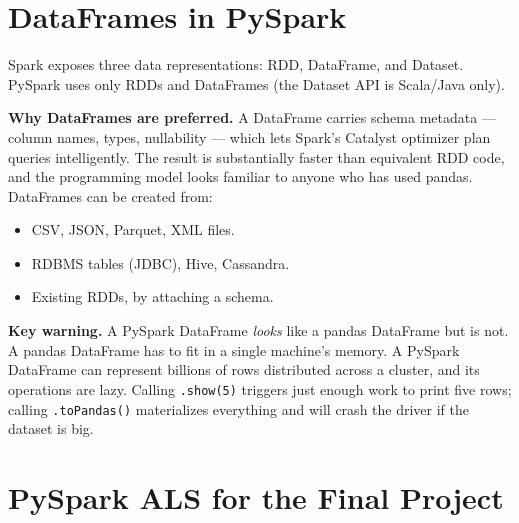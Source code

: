 \documentclass[11pt]{article}
\begin{document}
\section{DataFrames in PySpark}

Spark exposes three data representations: RDD, DataFrame, and Dataset. PySpark uses only RDDs and DataFrames (the Dataset API is Scala/Java only).

\textbf{Why DataFrames are preferred.} A DataFrame carries schema metadata --- column names, types, nullability --- which lets Spark's Catalyst optimizer plan queries intelligently. The result is substantially faster than equivalent RDD code, and the programming model looks familiar to anyone who has used pandas. DataFrames can be created from:

\begin{itemize}
    \item CSV, JSON, Parquet, XML files.
    \item RDBMS tables (JDBC), Hive, Cassandra.
    \item Existing RDDs, by attaching a schema.
\end{itemize}

\textbf{Key warning.} A PySpark DataFrame \emph{looks} like a pandas DataFrame but is not. A pandas DataFrame has to fit in a single machine's memory. A PySpark DataFrame can represent billions of rows distributed across a cluster, and its operations are lazy. Calling \texttt{.show(5)} triggers just enough work to print five rows; calling \texttt{.toPandas()} materializes everything and will crash the driver if the dataset is big.


\section{PySpark ALS for the Final Project}
\end{document}

